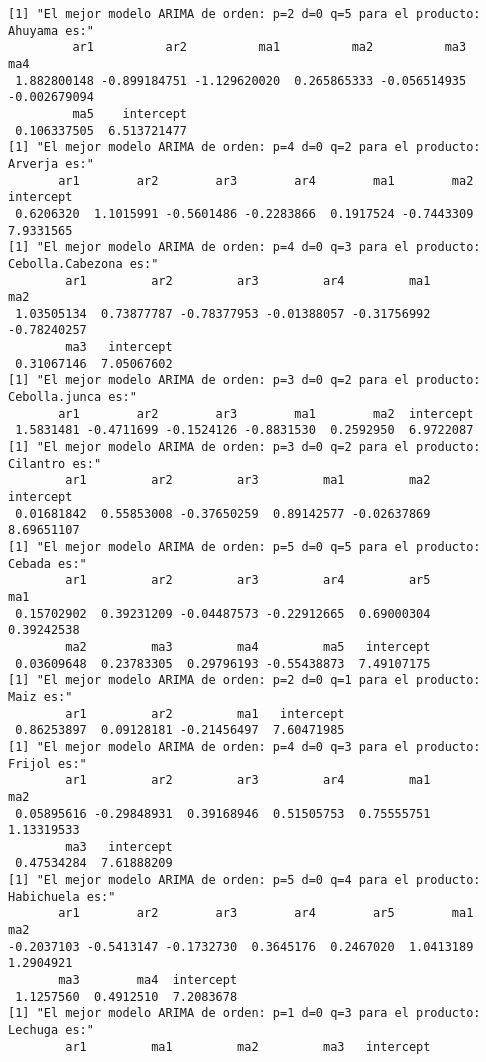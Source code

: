 \documentclass[11pt]{article}
\begin{document}
    \begin{Verbatim}[commandchars=\\\{\}]
[1] "El mejor modelo ARIMA de orden: p=2 d=0 q=5 para el producto: Ahuyama es:"
         ar1          ar2          ma1          ma2          ma3          ma4 
 1.882800148 -0.899184751 -1.129620020  0.265865333 -0.056514935 -0.002679094 
         ma5    intercept 
 0.106337505  6.513721477 
[1] "El mejor modelo ARIMA de orden: p=4 d=0 q=2 para el producto: Arverja es:"
       ar1        ar2        ar3        ar4        ma1        ma2  intercept 
 0.6206320  1.1015991 -0.5601486 -0.2283866  0.1917524 -0.7443309  7.9331565 
[1] "El mejor modelo ARIMA de orden: p=4 d=0 q=3 para el producto: Cebolla.Cabezona es:"
        ar1         ar2         ar3         ar4         ma1         ma2 
 1.03505134  0.73877787 -0.78377953 -0.01388057 -0.31756992 -0.78240257 
        ma3   intercept 
 0.31067146  7.05067602 
[1] "El mejor modelo ARIMA de orden: p=3 d=0 q=2 para el producto: Cebolla.junca es:"
       ar1        ar2        ar3        ma1        ma2  intercept 
 1.5831481 -0.4711699 -0.1524126 -0.8831530  0.2592950  6.9722087 
[1] "El mejor modelo ARIMA de orden: p=3 d=0 q=2 para el producto: Cilantro es:"
        ar1         ar2         ar3         ma1         ma2   intercept 
 0.01681842  0.55853008 -0.37650259  0.89142577 -0.02637869  8.69651107 
[1] "El mejor modelo ARIMA de orden: p=5 d=0 q=5 para el producto: Cebada es:"
        ar1         ar2         ar3         ar4         ar5         ma1 
 0.15702902  0.39231209 -0.04487573 -0.22912665  0.69000304  0.39242538 
        ma2         ma3         ma4         ma5   intercept 
 0.03609648  0.23783305  0.29796193 -0.55438873  7.49107175 
[1] "El mejor modelo ARIMA de orden: p=2 d=0 q=1 para el producto: Maiz es:"
        ar1         ar2         ma1   intercept 
 0.86253897  0.09128181 -0.21456497  7.60471985 
[1] "El mejor modelo ARIMA de orden: p=4 d=0 q=3 para el producto: Frijol es:"
        ar1         ar2         ar3         ar4         ma1         ma2 
 0.05895616 -0.29848931  0.39168946  0.51505753  0.75555751  1.13319533 
        ma3   intercept 
 0.47534284  7.61888209 
[1] "El mejor modelo ARIMA de orden: p=5 d=0 q=4 para el producto: Habichuela es:"
       ar1        ar2        ar3        ar4        ar5        ma1        ma2 
-0.2037103 -0.5413147 -0.1732730  0.3645176  0.2467020  1.0413189  1.2904921 
       ma3        ma4  intercept 
 1.1257560  0.4912510  7.2083678 
[1] "El mejor modelo ARIMA de orden: p=1 d=0 q=3 para el producto: Lechuga es:"
        ar1         ma1         ma2         ma3   intercept 

\end{Verbatim}
\end{document}
